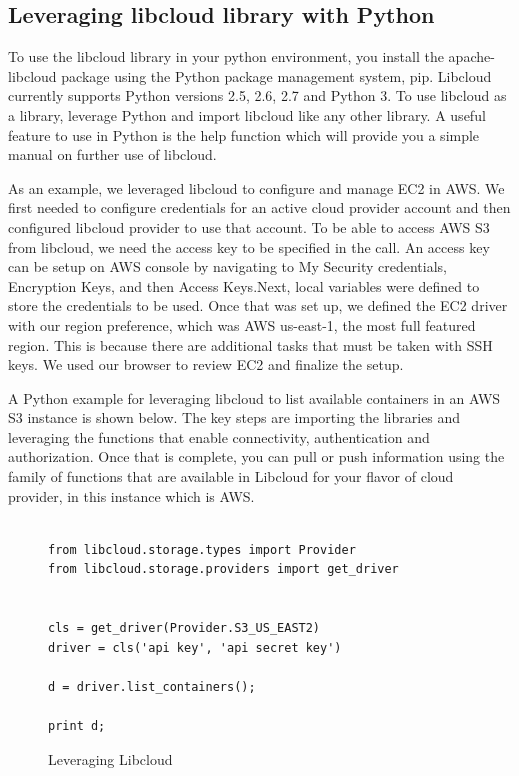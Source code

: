 \subsection{Leveraging libcloud library with Python}

To use the libcloud library in your python environment, you install the
apache-libcloud package using the Python package management system, pip.
Libcloud currently supports Python versions 2.5, 2.6, 2.7 and Python 3. To use
libcloud as a library, leverage Python and import libcloud like any other
library. A useful feature to use in Python is the help function which will
provide you a simple manual on further use of libcloud.

As an example, we leveraged libcloud to configure and manage EC2 in AWS. We
first needed to configure credentials for an active cloud provider account and
then configured libcloud provider to use that account. To be able to access AWS
S3 from libcloud, we need the access key to be specified in the call. An access
key can be setup on AWS console by navigating to My Security credentials,
Encryption Keys, and then Access Keys.Next, local variables were defined to
store the credentials to be used. Once that was set up, we defined the EC2 
driver with our region preference, which was AWS us-east-1, the most full
featured region. This is because there are additional tasks that must be taken
with SSH keys. We used our browser to review EC2 and finalize the setup.

A Python example for leveraging libcloud to list available containers in an AWS
S3 instance is shown below. The key steps are importing the libraries and
leveraging the functions that enable connectivity, authentication and
authorization. Once that is complete, you can pull or push information using
the
family of functions that are available in Libcloud for your flavor of cloud
provider, in this instance which is AWS.

\begin{figure}[htb]

\begin{verbatim}

from libcloud.storage.types import Provider
from libcloud.storage.providers import get_driver


cls = get_driver(Provider.S3_US_EAST2)
driver = cls('api key', 'api secret key')

d = driver.list_containers();

print d;

\end{verbatim}

\caption{Leveraging Libcloud
~\cite{hid-sp18-518-LibCloud}}\label{c:libcloud-example}

\end{figure}


